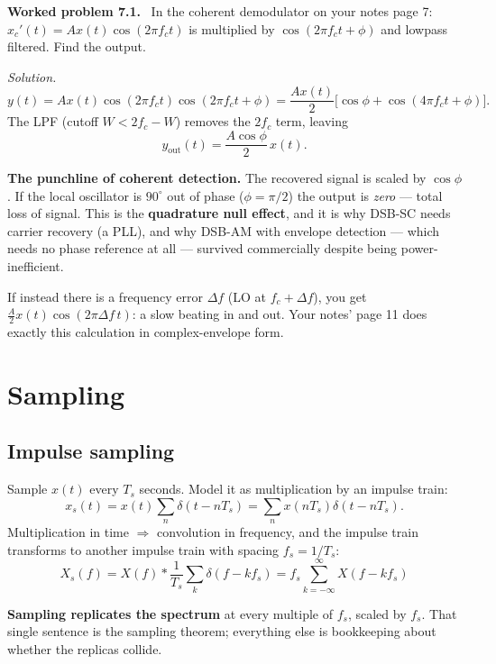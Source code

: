 \documentclass[11pt,a4paper]{article}
\newenvironment{worked}[1]{\par\vspace{4pt}\noindent\textbf{\color{warmred}Worked problem #1.}\ \ignorespaces}{\par\vspace{4pt}}
\newcommand{\soln}{\par\vspace{2pt}\noindent\textit{Solution.}\ \ignorespaces}
\begin{document}
\begin{worked}{7.1}
In the coherent demodulator on your notes page 7: $x_c'(t)=Ax(t)\cos(2\pi f_ct)$ is multiplied by
$\cos(2\pi f_ct+\phi)$ and lowpass filtered. Find the output.
\end{worked}
\soln
\[
y(t)=Ax(t)\cos(2\pi f_ct)\cos(2\pi f_ct+\phi)=\frac{Ax(t)}{2}\big[\cos\phi+\cos(4\pi f_ct+\phi)\big].
\]
The LPF (cutoff $W<2f_c-W$) removes the $2f_c$ term, leaving
\[
\boxed{y_{\text{out}}(t)=\frac{A\cos\phi}{2}\,x(t)}.
\]
\begin{keybox}
\textbf{The punchline of coherent detection.} The recovered signal is scaled by $\cos\phi$. If the local
oscillator is $90^\circ$ out of phase ($\phi=\pi/2$) the output is \emph{zero} --- total loss of signal. This
is the \textbf{quadrature null effect}, and it is why DSB-SC needs carrier recovery (a PLL), and why DSB-AM
with envelope detection --- which needs no phase reference at all --- survived commercially despite being
power-inefficient.
\end{keybox}
If instead there is a frequency error $\Delta f$ (LO at $f_c+\Delta f$), you get
$\frac{A}{2}x(t)\cos(2\pi\Delta f\,t)$: a slow beating in and out. Your notes' page 11 does exactly this
calculation in complex-envelope form.

\section{Sampling}

\subsection{Impulse sampling}
Sample $x(t)$ every $T_s$ seconds. Model it as multiplication by an impulse train:
\[
x_s(t)=x(t)\sum_{n}\delta(t-nT_s)=\sum_n x(nT_s)\delta(t-nT_s).
\]
Multiplication in time $\Rightarrow$ convolution in frequency, and the impulse train transforms to another
impulse train with spacing $f_s=1/T_s$:
\[
X_s(f)=X(f)*\frac{1}{T_s}\sum_k\delta\!\left(f-kf_s\right)
=\boxed{f_s\sum_{k=-\infty}^{\infty}X(f-kf_s)}
\]

\begin{keybox}
\textbf{Sampling replicates the spectrum} at every multiple of $f_s$, scaled by $f_s$. That single sentence is
the sampling theorem; everything else is bookkeeping about whether the replicas collide.
\end{keybox}
\end{document}
